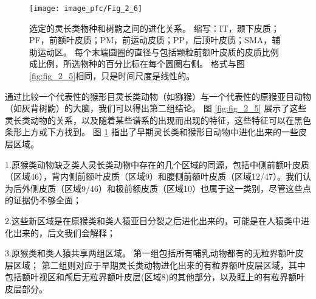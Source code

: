 \begin{figure}[!htb]
	\centering
	\texttt{[image: image\_pfc/Fig\_2\_6]}
	\caption{选定的灵长类物种和树鼩之间的进化关系。
		缩写：IT，颞下皮质；PF，前额叶皮质；PM，前运动皮质；PP，后顶叶皮质；SMA，辅助运动区。
		每个末端圆圈的直径与包括颗粒前额叶皮质的皮质比例成比例，所选物种的百分比标在每个圆圈右侧。
		格式与图\ref{fig:fig_2_5}相同，只是时间尺度是线性的。\label{fig:fig_2_6}}
\end{figure}

通过比较一个代表性的猴形目灵长类动物（如猕猴）与一个代表性的原猴亚目动物（如灰背树鼩）的大脑，我们可以得出第二组结论。
图 \ref{fig:fig_2_5} 展示了这些灵长类动物的关系，以及随着某些谱系的出现而出现的特征，这些特征可以在黑色条形上方或下方找到。
图 \ref{fig:fig_2_6} 指出了早期灵长类和猴形目动物中进化出来的一些皮层区域。\par


1.原猴类动物缺乏类人灵长类动物中存在的几个区域的同源，包括中侧前额叶皮质（区域46），背内侧前额叶皮质（区域9）和腹侧前额叶皮质（区域12/47）。我们认为后外侧皮质（区域9/46）和极前额皮质（区域10）也属于这一类别，尽管这些点的证据仍不够全面；\par


2.这些新区域是在原猴类和类人猿亚目分裂之后进化出来的，可能是在人猿类中进化出来的，后文我们会解释；\par


3.原猴类和类人猿共享两组区域。
第一组包括所有哺乳动物都有的无粒界额叶皮层区域；
第二组则对应于早期灵长类动物进化出来的有粒界额叶皮层区域，其中包括额叶视区和颅后无粒界额叶皮层(区域8)的其他部分，以及眶上的有粒界额叶皮层部分。

